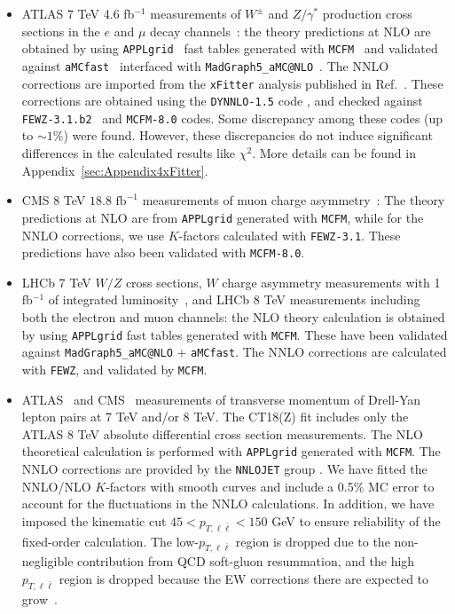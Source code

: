 \begin{itemize}
\item ATLAS 7 TeV 4.6 fb$^{-1}$ measurements of $W^{\pm}$ and $Z/\gamma^{*}$ production cross 
sections in the $e$ and $\mu$ decay channels~\cite{Aaboud:2016btc}: 
the theory predictions at NLO are obtained by using \texttt{APPLgrid}~\cite{Carli:2010rw} fast tables 
generated with \texttt{MCFM}~\cite{Campbell:2010ff} and validated against \texttt{aMCfast}~\cite{Bertone:2014zva} 
interfaced with \texttt{MadGraph5\_aMC@NLO}~\cite{Alwall:2014hca}. The NNLO corrections are imported from the 
\texttt{xFitter} analysis published in Ref.~\cite{Aaboud:2016btc}. These corrections are 
obtained using the \texttt{DYNNLO-1.5} code  \cite{Catani:2007vq,Catani:2009sm}, and checked against  \texttt{FEWZ-3.1.b2}~\cite{Gavin:2010az,Gavin:2012sy,Li:2012wna} and \texttt{MCFM-8.0} \cite{Boughezal:2016wmq} codes. Some discrepancy among these codes (up to $\sim\!1\%$) were found. However,  
these discrepancies do not induce significant differences
in the calculated results like $\chi^2$. More details can be found in Appendix~\ref{sec:Appendix4xFitter}.


\item CMS 8 TeV 
$18.8 \mbox{ fb}^{-1}$ measurements of muon charge asymmetry~\cite{Khachatryan:2016pev}: 
The theory predictions at NLO are from \texttt{APPLgrid} generated with \texttt{MCFM}, while for the NNLO 
corrections, we use $K$-factors calculated with \texttt{FEWZ-3.1}. These predictions have also been validated with \texttt{MCFM-8.0}. 

\item LHCb 7 TeV $W/Z$ cross sections, $W$ charge asymmetry measurements with 1 fb$^{-1}$ of integrated luminosity~\cite{Aaij:2015gna}, 
and LHCb 8 TeV measurements including both the electron \cite{Aaij:2015vua} and muon \cite{Aaij:2015zlq} channels: 
the NLO theory calculation is obtained by using \texttt{APPLgrid} fast tables generated with \texttt{MCFM}. 
These have been validated against \texttt{MadGraph5\_aMC@NLO} + \texttt{aMCfast}. The NNLO corrections are calculated with  \texttt{FEWZ}, and validated by \texttt{MCFM}.

\item ATLAS~\cite{Aad:2014xaa,Aad:2015auj} and CMS~\cite{Khachatryan:2015oaa} measurements of transverse momentum of Drell-Yan lepton pairs at 7 TeV and/or 8 TeV. 
The CT18(Z) fit includes only the ATLAS 8 TeV absolute differential cross section measurements. The NLO theoretical calculation is performed with \texttt{APPLgrid} generated with \texttt{MCFM}. The NNLO corrections are provided by the \texttt{NNLOJET} group \cite{Ridder:2015dxa,Gehrmann-DeRidder:2017mvr}.
We have fitted the NNLO/NLO $K$-factors with smooth curves and include a 0.5\% MC error to account for the fluctuations in the NNLO calculations.
In addition, we have imposed the kinematic cut $45\!<\!p_{T,  \ell \bar \ell}\!<\!150$ GeV  to ensure reliability of the fixed-order calculation. 
The low-$p_{T,  \ell \bar \ell}$ region is dropped due to the non-negligible contribution from QCD soft-gluon resummation, and the high $p_{T,  \ell \bar \ell}$ region is dropped because the EW corrections there are expected to grow~\cite{Hollik:2015pja,Kallweit:2015fta}.


\end{itemize}
